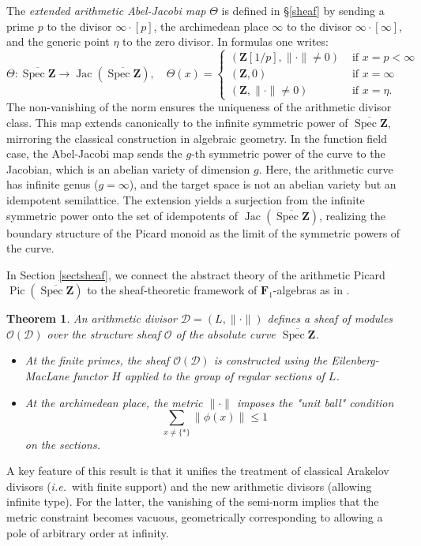 \documentclass[11pt,a4paper]{article}
\newcommand{\Z}{\mathbf{Z}}
\def\F{{\mathbf F}}
\def\spzb{\overline{\Spec \Z}}
\newcommand{\Spec}{\operatorname{Spec}}
\def\Pic{\operatorname{Pic}}
\def\Jac{\operatorname{Jac}}
\def\F1{\mathbf F_1}
\def\ie{{\it i.e.\/}\ }
\theoremstyle{plain}
\newtheorem{thm}{Theorem}[section]
\theoremstyle{definition} %
\begin{document}
The \emph{extended arithmetic Abel-Jacobi map} $\Theta$ is defined in \S \ref{sheaf} by sending a prime $p$ to the divisor $\infty \cdot [p]$, the archimedean place $\infty$ to the divisor $\infty \cdot [\infty]$, and the generic point $\eta$ to the zero divisor. In formulas one writes:
\[
\Theta: \spzb \longrightarrow \Jac(\spzb), \quad\Theta(x)= \begin{cases}(\mathbf{Z}[1 / p],\|\cdot\|\neq 0) & \text { if } x=p<\infty  \\ (\mathbf{Z}, 0) & \text { if } x=\infty \\ (\mathbf{Z},\|\cdot\|\neq 0) & \text { if } x=\eta.\end{cases}
\]
The non-vanishing of the norm ensures the uniqueness of the arithmetic divisor class. This map extends canonically to the infinite symmetric power of $\spzb$, mirroring the classical construction in algebraic geometry. In the function field case, the Abel-Jacobi map sends the $g$-th symmetric power of the curve to the Jacobian, which is an abelian variety of dimension $g$. Here, the arithmetic curve has infinite genus ($g=\infty$), and the target space is not an abelian variety but an idempotent semilattice. The extension yields a surjection from the infinite symmetric power onto the set of idempotents of $\Jac(\spzb)$, realizing the boundary structure of the Picard monoid as the limit of the symmetric powers of the curve.





\vspace{.05in}



In Section \ref{sectsheaf}, we connect the abstract theory of the arithmetic  Picard $\Pic(\spzb)$ to the sheaf-theoretic framework of $\F1$-algebras as in \cite{CC2}. 
\begin{thm}
An arithmetic divisor $\mathcal{D} = (L, \|\cdot\|)$ defines a sheaf of modules $\mathcal{O}(\mathcal{D})$ over the structure sheaf $\mathcal O$ of the \emph{absolute curve} $\spzb$.
\begin{itemize}[leftmargin=*, labelindent=0pt]
    \item[-] At the finite primes, the sheaf $\mathcal{O}(\mathcal{D})$ is constructed using the Eilenberg-MacLane functor $H$ applied to the group of regular sections of $L$.
    \item[-] At the archimedean place, the metric $\|\cdot\|$ imposes the "unit ball" condition $$\sum_{x \neq\{*\}} \|\phi(x)\| \le 1$$ on the sections.
\end{itemize}
\end{thm}
A key feature of this result is that it unifies the treatment of classical Arakelov divisors (\ie with finite support) and the new arithmetic divisors (allowing infinite type). For the latter, the vanishing of the semi-norm implies that the metric constraint becomes vacuous, geometrically corresponding to allowing a pole of arbitrary order at infinity.\vspace{.05in}
\end{document}
